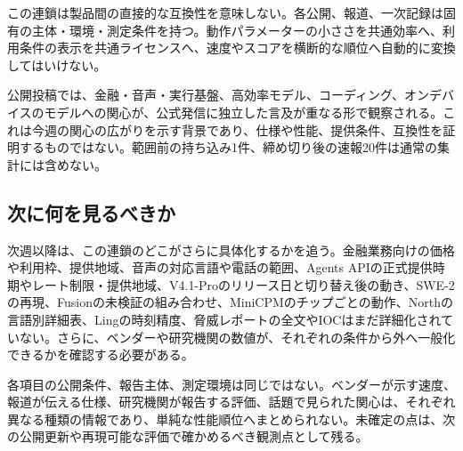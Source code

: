 この連鎖は製品間の直接的な互換性を意味しない。各公開、報道、一次記録は固有の主体・環境・測定条件を持つ。動作パラメーターの小ささを共通効率へ、利用条件の表示を共通ライセンスへ、速度やスコアを横断的な順位へ自動的に変換してはいけない。

\begin{communitynote}
公開投稿では、金融・音声・実行基盤、高効率モデル、コーディング、オンデバイスのモデルへの関心が、公式発信に独立した言及が重なる形で観察される。これは今週の関心の広がりを示す背景であり、仕様や性能、提供条件、互換性を証明するものではない。範囲前の持ち込み1件、締め切り後の速報20件は通常の集計には含めない。
\end{communitynote}

\clearpage
\subsection*{次に何を見るべきか}
次週以降は、この連鎖のどこがさらに具体化するかを追う。金融業務向けの価格や利用枠、提供地域、音声の対応言語や電話の範囲、Agents APIの正式提供時期やレート制限・提供地域、V4.1-Proのリリース日と切り替え後の動き、SWE-2の再現、Fusionの未検証の組み合わせ、MiniCPMのチップごとの動作、Northの言語別詳細表、Lingの時刻精度、脅威レポートの全文やIOCはまだ詳細化されていない。さらに、ベンダーや研究機関の数値が、それぞれの条件から外へ一般化できるかを確認する必要がある。

\begin{claimboundary}[この総括の読み方]
各項目の公開条件、報告主体、測定環境は同じではない。ベンダーが示す速度、報道が伝える仕様、研究機関が報告する評価、話題で見られた関心は、それぞれ異なる種類の情報であり、単純な性能順位へまとめられない。未確定の点は、次の公開更新や再現可能な評価で確かめるべき観測点として残る。
\end{claimboundary}
